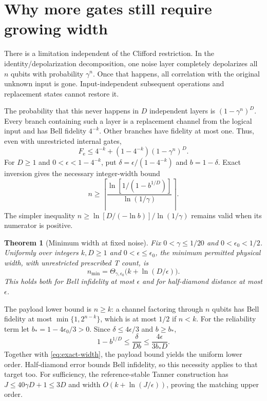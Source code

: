 \documentclass[11pt,a4paper]{article}
\numberwithin{equation}{section}
\newtheorem{theorem}{Theorem}[section]
\theoremstyle{remark}\newtheorem*{remark}{Interpretation}
\newcommand{\eps}{\epsilon}
\newcommand{\Fe}{F_{\mathrm e}}
\begin{document}
\section{Why more gates still require growing width}
There is a limitation independent of the Clifford restriction. In the identity/depolarization decomposition, one noise layer completely depolarizes all $n$ qubits with probability $\gamma^n$. Once that happens, all correlation with the original unknown input is gone. Input-independent subsequent operations and replacement states cannot restore it.

The probability that this never happens in $D$ independent layers is $(1-\gamma^n)^D$. Every branch containing such a layer is a replacement channel from the logical input and has Bell fidelity $4^{-k}$. Other branches have fidelity at most one. Thus, even with unrestricted internal gates,
\begin{equation}
\boxed{\Fe\le4^{-k}+(1-4^{-k})(1-\gamma^n)^D.}
\label{eq:ceiling}
\end{equation}
For $D\ge1$ and $0<\eps<1-4^{-k}$, put $\delta=\eps/(1-4^{-k})$ and $b=1-\delta$. Exact inversion gives the necessary integer-width bound
\begin{equation}
n\ge\left\lceil\frac{\ln[1/(1-b^{1/D})]}{\ln(1/\gamma)}\right\rceil.
\label{eq:exact-width}
\end{equation}
The simpler inequality $n\ge\ln[D/(-\ln b)]/\ln(1/\gamma)$ remains valid when its numerator is positive.

\begin{theorem}[Minimum width at fixed noise]
Fix $0<\gamma\le1/20$ and $0<\eps_0<1/2$. Uniformly over integers $k,D\ge1$ and $0<\eps\le\eps_0$, the minimum permitted physical width, with unrestricted prescribed T count, is
\begin{equation}
n_{\min}=\Theta_{\gamma,\eps_0}\bigl(k+\ln(D/\eps)\bigr).
\end{equation}
This holds both for Bell infidelity at most $\eps$ and for half-diamond distance at most $\eps$.
\end{theorem}

The payload lower bound is $n\ge k$: a channel factoring through $n$ qubits has Bell fidelity at most $\min\{1,2^{n-k}\}$, which is at most $1/2$ if $n<k$. For the reliability term let $b_*=1-4\eps_0/3>0$. Since $\delta\le4\eps/3$ and $b\ge b_*$,
\[
1-b^{1/D}\le\frac{\delta}{Db}
\le\frac{4\eps}{3b_*D}.
\]
Together with \eqref{eq:exact-width}, the payload bound yields the uniform lower order. Half-diamond error bounds Bell infidelity, so this necessity applies to that target too. For sufficiency, the reference-stable Tanner construction has $J\le40\gamma D+1\le3D$ and width $O(k+\ln(J/\eps))$, proving the matching upper order.
\end{document}
